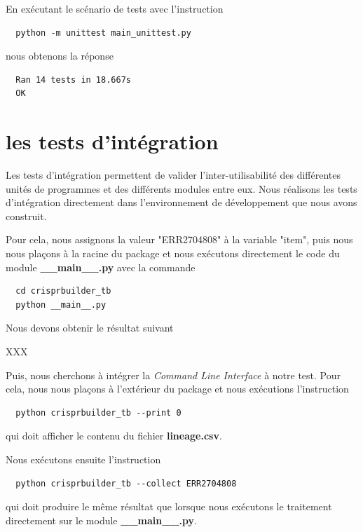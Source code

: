 \documentclass[twoside,a4paper,11pt,frenchb,openany]{report}
\begin{document}
En exécutant le scénario de tests avec l'instruction

\begin{verbatim}
  python -m unittest main_unittest.py
\end{verbatim}

nous obtenons la réponse

\begin{verbatim}
  Ran 14 tests in 18.667s
  OK
\end{verbatim}




\section{les tests d'intégration}

Les tests d'intégration permettent de valider l'inter-utilisabilité des différentes unités de programmes  et des différents modules entre eux. Nous réalisons les tests d'intégration directement dans l'environnement de développement que nous avons construit.

Pour cela, nous assignons la valeur "ERR2704808" à la variable "item", puis nous nous plaçons à la racine du package et nous exécutons directement le code du module \textbf{\_\_main\_\_.py} avec la commande 

\begin{verbatim}
  cd crisprbuilder_tb
  python __main__.py
\end{verbatim}

Nous devons obtenir le résultat suivant 

XXX

Puis, nous cherchons à intégrer la \textit{Command Line Interface} à notre test. Pour cela, nous nous plaçons à l'extérieur du package et nous exécutions l'instruction

\begin{verbatim}
  python crisprbuilder_tb --print 0
\end{verbatim}

qui doit afficher le contenu du fichier \textbf{lineage.csv}.

Nous exécutons ensuite l'instruction

\begin{verbatim}
  python crisprbuilder_tb --collect ERR2704808
\end{verbatim}

qui doit produire le même résultat que lorsque nous exécutons le traitement directement sur le module \textbf{\_\_main\_\_.py}.
\end{document}
